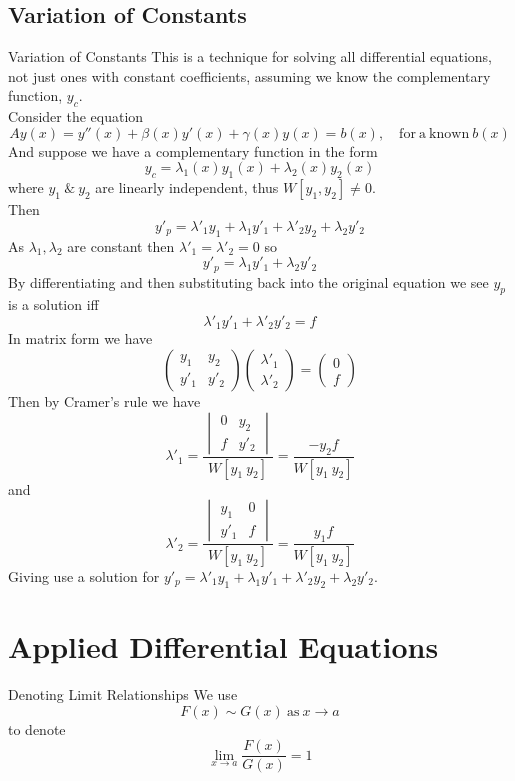 \documentclass[11pt,a4paper]{article}
\begin{document}
\subsection{Variation of Constants}
%
\subtitle{Theorem 6.13 - }{Variation of Constants}
This is a technique for solving all differential equations, not just ones with constant coefficients, assuming we know the complementary function, $y_c$. \\
Consider the equation $$Ay(x) = y''(x) + \beta(x)y'(x) + \gamma(x)y(x) = b(x),\quad \mathrm{for\ a\ known\ }b(x)$$
And suppose we have a complementary function in the form $$y_c = \lambda_1(x)y_1(x) + \lambda_2(x)y_2(x)$$ where $y_1\ \&\ y_2$ are linearly independent, thus $W[y_1, y_2] \not = 0$. \\
Then $$y'_p = \lambda'_1 y_1 + \lambda_1 y'_1 + \lambda'_2 y_2 + \lambda_2 y'_2$$
As $\lambda_1, \lambda_2$ are constant then $\lambda'_1 = \lambda'_2 = 0$ so $$y'_p = \lambda_1y'_1 + \lambda_2y'_2$$
By differentiating and then substituting back into the original equation we see $y_p$ is a solution iff $$\lambda'_1y'_1 + \lambda'_2y'_2 = f$$
In matrix form we have $$\begin{pmatrix} y_1 & y_2 \\ y'_1 & y'_2 \end{pmatrix} \begin{pmatrix} \lambda'_1 \\ \lambda'_2 \end{pmatrix} = \begin{pmatrix} 0 \\ f \end{pmatrix}$$
Then by Cramer's rule we have $$\lambda'_1 = \frac{\begin{vmatrix}0 & y_2 \\ f & y'_2 \end{vmatrix}}{W[y_1\ y_2]} = \frac{-y_2f}{W[y_1\ y_2]}$$
and $$\lambda'_2 = \frac{\begin{vmatrix}y_1 & 0 \\ y'_1 & f \end{vmatrix}}{W[y_1\ y_2]} = \frac{y_1f}{W[y_1\ y_2]}$$
Giving use a solution for $y'_p = \lambda'_1 y_1 + \lambda_1 y'_1 + \lambda'_2 y_2 + \lambda_2 y'_2$.

\section{Applied Differential Equations}
%
\subtitle{Definition 7.01 - }{Denoting Limit Relationships}
We use $$F(x) \sim G(x)\ \mathrm{as}\ x \to a$$ to denote $$\lim_{x \to a} \frac{F(x)}{G(x)} = 1$$
\end{document}
